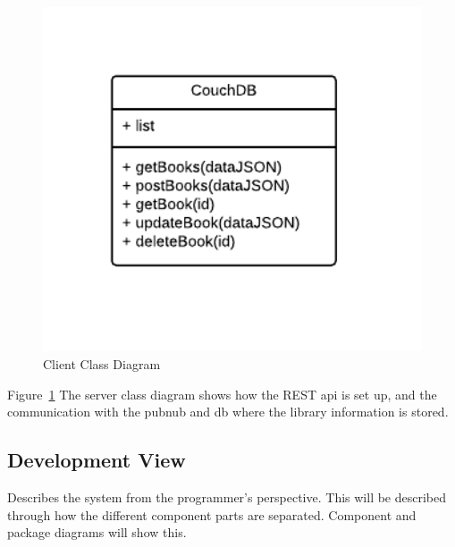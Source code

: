 \begin{figure}
\centering
\includegraphics[width=6in]{image/serverClassDiagram.png}
\caption{Client Class Diagram}
\label{figure:serverClassDiagram}
\end{figure}

Figure~\ref{figure:serverClassDiagram} The server class diagram shows how the REST api is set up, and the communication with the pubnub and db where the library information is stored.



\subsection{Development View}
Describes the system from the programmer's perspective. This will be described through how the different component parts are separated. Component and package diagrams will show this.

